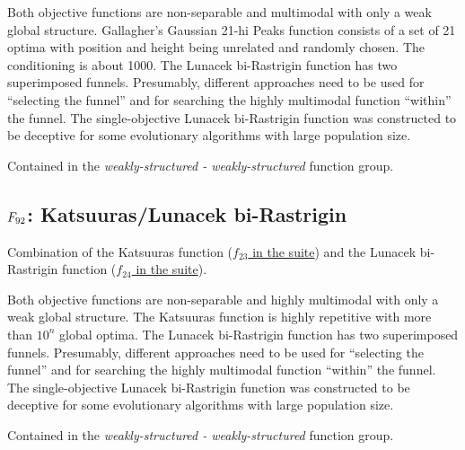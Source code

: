 Both objective functions are non-separable and multimodal with
only a weak global structure. Gallagher's Gaussian 21-hi Peaks
function consists of a set of 21 optima with position and height being
unrelated and randomly chosen. The conditioning is about 1000.
The Lunacek bi-Rastrigin function has two superimposed funnels. Presumably,
different approaches need to be used for ``selecting the funnel''
and for searching the highly multimodal function ``within'' the funnel.
The single-objective Lunacek bi-Rastrigin function was constructed
to be deceptive for some evolutionary algorithms with large population size.

Contained in the \emph{weakly-structured - weakly-structured} function group.



\subsection[\texorpdfstring{\protect\(F_{92}\protect\): Katsuuras/Lunacek bi-Rastrigin}{F92: Katsuuras/Lunacek bi-Rastrigin}]{\texorpdfstring{\protect\(F_{92}\protect\): Katsuuras/Lunacek bi-Rastrigin}{}}
\label{index:f92}\label{index:katsuuras-lunacek-bi-rastrigin}
Combination of the Katsuuras function (\href{https://coco.gforge.inria.fr/downloads/download16.00/bbobdocfunctions.pdf\#page=115}{\(f_{23}\) in the \bbob suite}) and the
Lunacek bi-Rastrigin function (\href{https://coco.gforge.inria.fr/downloads/download16.00/bbobdocfunctions.pdf\#page=120}{\(f_{24}\) in the \bbob suite}).

Both objective functions are non-separable and highly multimodal with
only a weak global structure.
The Katsuuras function is highly repetitive with more than \(10^n\)
global optima.
The Lunacek bi-Rastrigin function has two superimposed funnels. Presumably,
different approaches need to be used for ``selecting the funnel''
and for searching the highly multimodal function ``within'' the funnel.
The single-objective Lunacek bi-Rastrigin function was constructed
to be deceptive for some evolutionary algorithms with large population size.

Contained in the \emph{weakly-structured - weakly-structured} function group.


